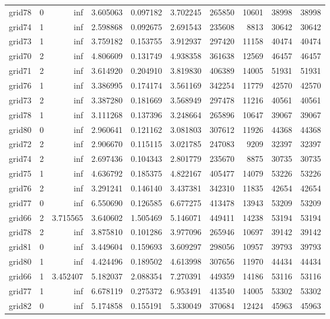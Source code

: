 \begin{longtable}{|l|r|r|r|r|r|r|r|r|r|}
grid78 & 0 & inf & 3.605063 & 0.097182 & 3.702245 & 265850 & 10601 & 38998 & 38998 \\
grid74 & 1 & inf & 2.598868 & 0.092675 & 2.691543 & 235608 & 8813 & 30642 & 30642 \\
grid73 & 1 & inf & 3.759182 & 0.153755 & 3.912937 & 297420 & 11158 & 40474 & 40474 \\
grid70 & 2 & inf & 4.806609 & 0.131749 & 4.938358 & 361638 & 12569 & 46457 & 46457 \\
grid71 & 2 & inf & 3.614920 & 0.204910 & 3.819830 & 406389 & 14005 & 51931 & 51931 \\
grid76 & 1 & inf & 3.386995 & 0.174174 & 3.561169 & 342254 & 11779 & 42570 & 42570 \\
grid73 & 2 & inf & 3.387280 & 0.181669 & 3.568949 & 297478 & 11216 & 40561 & 40561 \\
grid78 & 1 & inf & 3.111268 & 0.137396 & 3.248664 & 265896 & 10647 & 39067 & 39067 \\
grid80 & 0 & inf & 2.960641 & 0.121162 & 3.081803 & 307612 & 11926 & 44368 & 44368 \\
grid72 & 2 & inf & 2.906670 & 0.115115 & 3.021785 & 247083 & 9209 & 32397 & 32397 \\
grid74 & 2 & inf & 2.697436 & 0.104343 & 2.801779 & 235670 & 8875 & 30735 & 30735 \\
grid75 & 1 & inf & 4.636792 & 0.185375 & 4.822167 & 405477 & 14079 & 53226 & 53226 \\
grid76 & 2 & inf & 3.291241 & 0.146140 & 3.437381 & 342310 & 11835 & 42654 & 42654 \\
grid77 & 0 & inf & 6.550690 & 0.126585 & 6.677275 & 413478 & 13943 & 53209 & 53209 \\
grid66 & 2 & 3.715565 & 3.640602 & 1.505469 & 5.146071 & 449411 & 14238 & 53194 & 53194 \\
grid78 & 2 & inf & 3.875810 & 0.101286 & 3.977096 & 265946 & 10697 & 39142 & 39142 \\
grid81 & 0 & inf & 3.449604 & 0.159693 & 3.609297 & 298056 & 10957 & 39793 & 39793 \\
grid80 & 1 & inf & 4.424496 & 0.189502 & 4.613998 & 307656 & 11970 & 44434 & 44434 \\
grid66 & 1 & 3.452407 & 5.182037 & 2.088354 & 7.270391 & 449359 & 14186 & 53116 & 53116 \\
grid77 & 1 & inf & 6.678119 & 0.275372 & 6.953491 & 413540 & 14005 & 53302 & 53302 \\
grid82 & 0 & inf & 5.174858 & 0.155191 & 5.330049 & 370684 & 12424 & 45963 & 45963 \\

\end{longtable}
